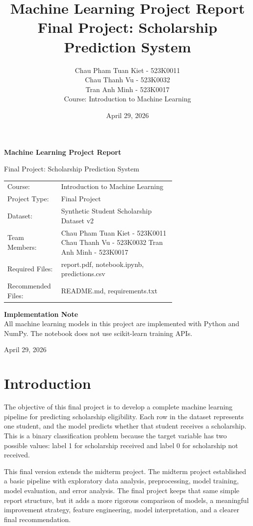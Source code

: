 ﻿\documentclass[12pt,a4paper]{article}
\title{\textbf{Machine Learning Project Report}\\
\large Final Project: Scholarship Prediction System}
\author{Chau Pham Tuan Kiet - 523K0011\\Chau Thanh Vu - 523K0032\\Tran Anh Minh - 523K0017\\Course: Introduction to Machine Learning}
\date{April 29, 2026}
\begin{document}
\begin{titlepage}
    \centering
    \vspace*{1.2cm}
    {\Huge \textbf{Machine Learning Project Report}\par}
    \vspace{0.4cm}
    {\Large Final Project: Scholarship Prediction System\par}
    \vspace{1.5cm}
    \begin{tabular}{lp{0.68\linewidth}}
        Course: & Introduction to Machine Learning \\
        Project Type: & Final Project \\
        Dataset: & Synthetic Student Scholarship Dataset v2 \\
        Team Members: & Chau Pham Tuan Kiet - 523K0011\newline
        Chau Thanh Vu - 523K0032\newline
        Tran Anh Minh - 523K0017 \\
        Required Files: & report.pdf, notebook.ipynb, predictions.csv \\
        Recommended Files: & README.md, requirements.txt \\
    \end{tabular}
    \vfill
    \textbf{Implementation Note}\\
    All machine learning models in this project are implemented with Python and NumPy.
    The notebook does not use scikit-learn training APIs.
    \vfill
    {\large April 29, 2026\par}
\end{titlepage}

\tableofcontents
\clearpage

\section{Introduction}

The objective of this final project is to develop a complete machine learning pipeline for predicting scholarship eligibility. Each row in the dataset represents one student, and the model predicts whether that student receives a scholarship. This is a binary classification problem because the target variable has two possible values: label 1 for scholarship received and label 0 for scholarship not received.

This final version extends the midterm project. The midterm project established a basic pipeline with exploratory data analysis, preprocessing, model training, model evaluation, and error analysis. The final project keeps that same simple report structure, but it adds a more rigorous comparison of models, a meaningful improvement strategy, feature engineering, model interpretation, and a clearer final recommendation.
\end{document}
